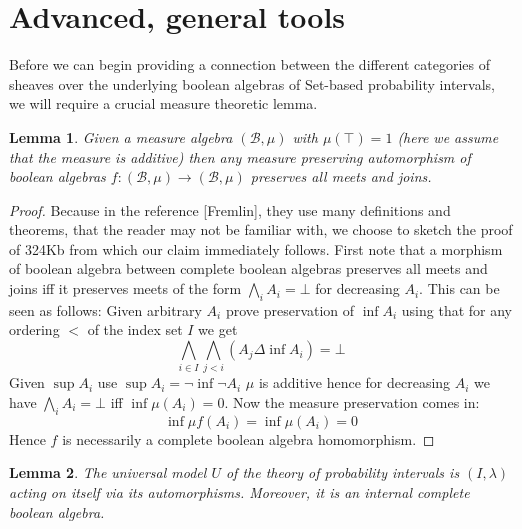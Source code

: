 \documentclass[a4paper]{amsproc}
\theoremstyle{plain}
\newtheorem{lemma}{Lemma}[section]
\theoremstyle{definition}
\theoremstyle{remark}
\numberwithin{equation}{section}
\begin{document}
\section{Advanced, general tools}
Before we can begin providing a connection between the different categories of sheaves over the underlying boolean algebras of Set-based probability intervals, we will require a crucial measure theoretic lemma.
\begin{lemma} Given a measure algebra $(\mathcal{B},\mu)$ with $\mu(\top)=1$ (here we assume that the measure is additive) then any measure preserving automorphism of boolean algebras $f:(\mathcal{B},\mu)\rightarrow (\mathcal{B},\mu)$ preserves all meets and joins.
\end{lemma}
\begin{proof} Because in the reference [Fremlin], they use many definitions and theorems, that the reader may not be familiar with, we choose to sketch the proof of 324Kb from which our claim immediately follows.\newline
\indent First note that a morphism of boolean algebra between complete boolean algebras preserves all meets and joins iff it preserves meets of the form $\bigwedge_i A_i=\bot$ for decreasing $A_i$. This can be seen as follows:\newline 
\indent  Given arbitrary $A_i$ prove preservation of $\inf A_i$ using that for any ordering $<$ of the index set $I$ we get
\[\bigwedge_{i\in I} \bigwedge_{j<i} (A_j \Delta \inf A_i)=\bot\] %
\indent Given $\sup A_i$ use $\sup A_i=\neg \inf \neg A_i$\newline
$\mu$ is additive hence for decreasing $A_i$ we have $\bigwedge_i A_i=\bot$ iff $\inf \mu(A_i)=0$. Now the measure preservation comes in:
\[ \inf \mu f(A_i)=\inf \mu(A_i)=0\]
Hence $f$ is necessarily a complete boolean algebra homomorphism.
\end{proof}
\begin{lemma} The universal model $U$ of the theory of probability intervals is $(I,\lambda)$ acting on itself via its automorphisms. Moreover, it is an internal complete boolean algebra.
\end{lemma}
\end{document}
